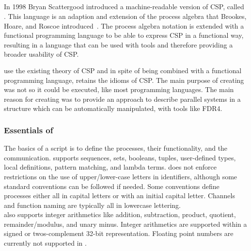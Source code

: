 \subsection{\cspm{}}
In 1998 Bryan Scattergood introduced a machine-readable version of CSP, called \cspm. This language is an adaption and extension of the process algebra that Brookes, Hoare, and Roscoe introduced~\cite{Brookes1984}. The process algebra notation is extended with a functional programming language to be able to express CSP in a functional way, resulting in a language that can be used with tools and therefore providing a broader usability of CSP.

\cspm{} use the existing theory of CSP and in spite of being combined with a functional programming language, \cspm{} retains the idioms of CSP.
The main purpose of creating \cspm{} was not so it could be executed, like most programming languages. The main reason for creating \cspm{} was to provide an approach to describe parallel systems in a structure which can be automatically manipulated, with tools like FDR4.

\subsubsection{Essentials of \cspm}
The basics of a \cspm{} script is to define the processes, their functionality, and the communication. \cspm{} supports sequences, sets, booleans, tuples, user-defined types, local definitions, pattern matching, and lambda terms.
\cspm{} does not enforce restrictions on the use of upper/lower-case letters in identifiers, although some standard conventions can be followed if needed. Some conventions define processes either all in capital letters or with an initial capital letter. Channels and function naming are typically all in lowercase lettering.\\

\cspm{} also supports integer arithmetics like addition, subtraction, product, quotient, remainder/modulus, and unary minus. Integer arithmetics are supported within a signed or twos-complement 32-bit representation.
Floating point numbers are currently not supported in \cspm. \\

